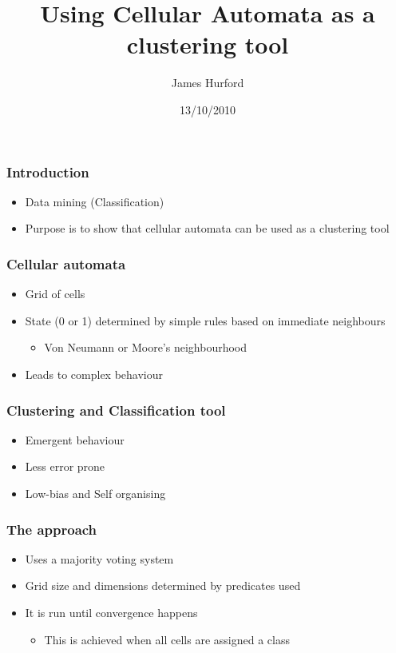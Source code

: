 \documentclass[presentation]{beamer}
\title{Using Cellular Automata as a clustering tool}
\author{James Hurford}
\date{13/10/2010}
\begin{document}
\maketitle




\begin{frame}
\frametitle{Introduction}
\label{sec-1}

\begin{itemize}
\item Data mining (Classification)
\item Purpose is to show that cellular automata can be used as a
   clustering tool
\end{itemize}
\end{frame}
\begin{frame}
\frametitle{Cellular automata}
\label{sec-2}

\begin{itemize}
\item Grid of cells
\item State (0 or 1) determined by simple rules based on immediate neighbours

\begin{itemize}
\item Von Neumann or Moore's neighbourhood
\end{itemize}

\item Leads to complex behaviour
\end{itemize}
\end{frame}
\begin{frame}
\frametitle{Clustering and Classification tool}
\label{sec-3}

\begin{itemize}
\item Emergent behaviour
\item Less error prone
\item Low-bias and Self organising
\end{itemize}
\end{frame}
\begin{frame}
\frametitle{The approach}
\label{sec-4}


\begin{itemize}
\item Uses a majority voting system
\item Grid size and dimensions determined by predicates used
\item It is run until convergence happens

\begin{itemize}
\item This is achieved when all cells are assigned a class
\end{itemize}

\end{itemize}
\end{frame}
\end{document}
